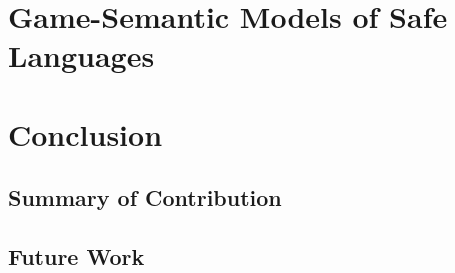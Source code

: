 \chapter{Game-Semantic Models of Safe Languages}

    



\chapter{Conclusion}
    \section{Summary of Contribution}
    \section{Future Work}



    
    

         {\protect{}}

